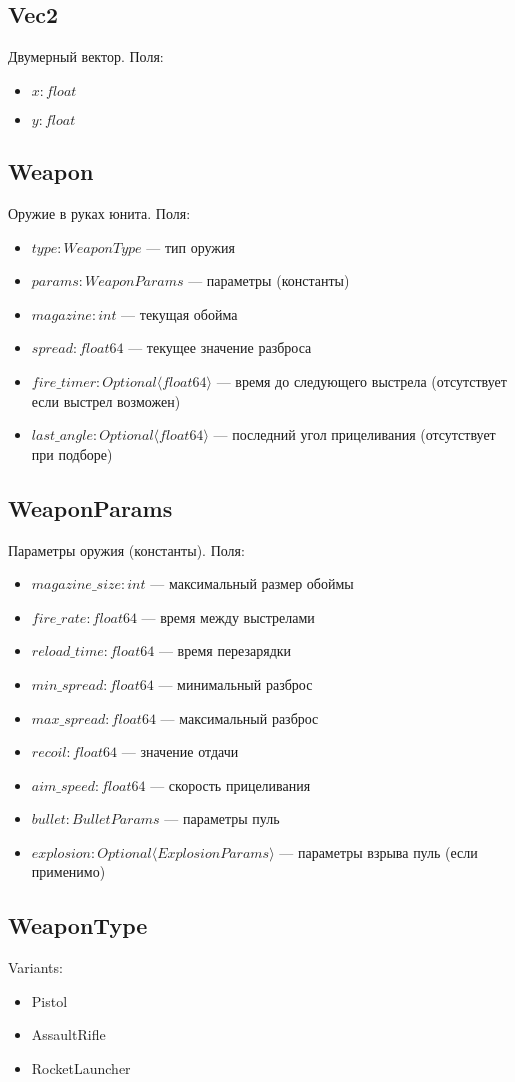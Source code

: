 \subsection{Vec2}
Двумерный вектор. Поля:
\begin{itemize}
    \item $x : float$
    \item $y : float$
\end{itemize}

\subsection{Weapon}
Оружие в руках юнита. Поля:
\begin{itemize}
    \item $type : WeaponType$ --- тип оружия
    \item $params : WeaponParams$ --- параметры (константы)
    \item $magazine : int$ --- текущая обойма
    \item $spread : float64$ --- текущее значение разброса
    \item $fire\_timer : Optional \langle float64 \rangle$ --- время до следующего выстрела (отсутствует если выстрел возможен)
    \item $last\_angle : Optional \langle float64 \rangle$ --- последний угол прицеливания (отсутствует при подборе)
\end{itemize}

\subsection{WeaponParams}
Параметры оружия (константы). Поля:
\begin{itemize}
    \item $magazine\_size : int$ --- максимальный размер обоймы
    \item $fire\_rate : float64$ --- время между выстрелами
    \item $reload\_time : float64$ --- время перезарядки
    \item $min\_spread : float64$ --- минимальный разброс
    \item $max\_spread : float64$ --- максимальный разброс
    \item $recoil : float64$ --- значение отдачи
    \item $aim\_speed : float64$ --- скорость прицеливания
    \item $bullet : BulletParams$ --- параметры пуль
    \item $explosion : Optional \langle ExplosionParams \rangle$ --- параметры взрыва пуль (если применимо)
\end{itemize}

\subsection{WeaponType}
Variants:
\begin{itemize}
    \item Pistol
    \item AssaultRifle
    \item RocketLauncher
\end{itemize}